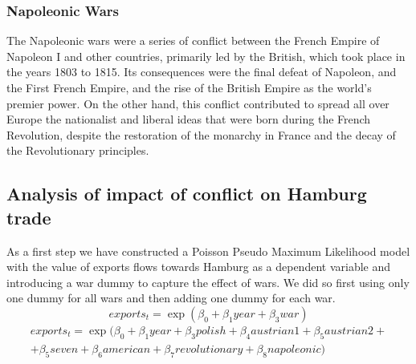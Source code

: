 \documentclass[12pt,a4paper,titlepage,english]{article}
\begin{document}
\subsubsection{Napoleonic Wars}
The Napoleonic wars were a series of conflict between the French Empire of Napoleon I and  other countries, primarily led by the British, which took place in the years 1803 to 1815. Its consequences were the final defeat of Napoleon, and the First French Empire, and the rise of the British Empire as the world's premier power. On the other hand, this conflict contributed to spread all over Europe the nationalist and liberal ideas that were born during the French Revolution, despite the restoration of the monarchy in France and the decay of the Revolutionary principles. 

\subsection{Analysis of impact of conflict on Hamburg trade}
As a first step we have constructed a Poisson Pseudo Maximum Likelihood model with the value of exports flows towards Hamburg as a dependent variable and introducing a war dummy to capture the effect of wars. We did so first using only one dummy for all wars and then adding one dummy for each war. 
\begin{equation}
exports_t=\exp(\beta_0+\beta_1year+\beta_3war)
\end{equation}
\begin{multline}
exports_t=\exp(\beta_0+\beta_1year+\beta_3polish +\beta_4austrian1 +\beta_5 austrian2+ \\ + \beta_5seven + \beta_6american +\beta_7revolutionary+\beta_8napoleonic)
\end{multline}
\end{document}
